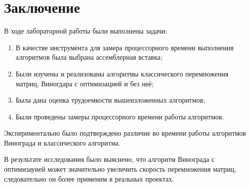 \section*{\large Заключение}
    \par В ходе лабораторной работы были выполнены задачи:
    \begin{enumerate}
        \item В качестве инструмента для замера процессорного времени выполнения алгоритмов была выбрана ассемблерная вставка;
        \item Были изучены и реализованы алгоритмы классического перемножения матриц, Виногдара с оптимизацией и без неё;
        \item Была дана оценка трудоемкости вышеизложенных алгоритмов;
        \item Были проведены замеры процессорного времени работы алгоритмов.
    \end{enumerate}
    \par Экспериментально было подтверждено различие во времени работы алгоритмов Винограда и классического алгоритма.
    \par В результате исследования было выяснено, что алгоритм Винограда с оптимизауией может значительно увеличить скорость перемножения матриц, следовательно он более применим в реальных проектах.
    \par \newpage
